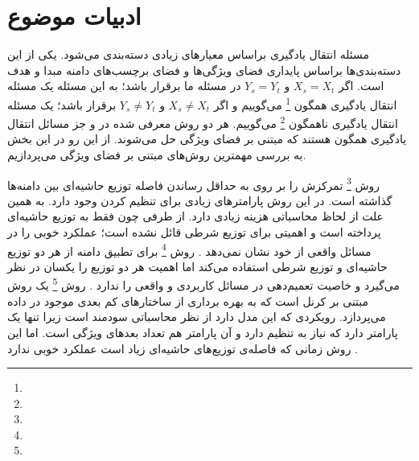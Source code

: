 \section{ادبیات موضوع}
{
	مسئله انتقال یادگیری براساس معیارهای زیادی دسته‌بندی می‌شود. یکی از این دسته‌بندی‌ها براساس پایداری فضای ویژگی‌ها و فضای برچسب‌های دامنه مبدا و هدف است. اگر 
	 $X_s = X_t$ 
	 و 
	 $Y_s=Y_t$
	 در مسئله ما برقرار باشد؛ به این مسئله یک مسئله انتقال یادگیری همگون
	 \footnote{}
	  می‌گوییم و اگر 
	  $X_s \neq X_t$ 
	 و 
	 $Y_s \neq Y_t$
	 برقرار باشد؛ یک مسئله انتقال یادگیری ناهمگون
	 \footnote{}
	  می‌گوییم. 
	 هر دو روش معرفی شده در 
	 \cite{wang2017balanced}
	 و
	 \cite{wang2019easy}
	 جز مسائل انتقال یادگیری همگون هستند که مبتنی بر فضای ویژگی حل می‌شوند. از این رو در این بخش به بررسی مهمترین روش‌های مبتنی بر فضای ویژگی می‌پردازیم.
	 
	 روش 
	 \footnote{}
	 تمرکزش را بر روی به حداقل رساندن فاصله توزیع حاشیه‌ای بین دامنه‌ها گذاشته است. در این روش پارامترهای زیادی برای تنظیم کردن وجود دارد. به همین علت از لحاظ محاسباتی هزینه زیادی دارد. از طرفی چون فقط به توزیع حاشیه‌ای پرداخته است و اهمیتی برای توزیع شرطی قائل نشده است؛ عملکرد خوبی را در مسائل واقعی از خود نشان نمی‌دهد
	 \cite{5640675}.
	 روش
	 \footnote{}
	 برای تطبیق دامنه از هر دو توزیع حاشیه‌ای و توزیع شرطی استفاده می‌کند اما اهمیت هر دو توزیع را یکسان در نظر می‌گیرد و خاصیت تعمیم‌دهی در مسائل کاربردی و واقعی را ندارد
	 \cite{6751384}.
	 روش
	 \footnote{}
     یک روش مبتنی بر کرنل است که به بهره برداری از ساختارهای کم بعدی موجود در داده می‌پردازد. رویکردی که این مدل دارد از نظر محاسباتی سودمند است زیرا تنها یک پارامتر دارد که نیاز به تنظیم دارد و آن پارامتر هم تعداد بعدهای ویژگی است. اما این روش زمانی که فاصله‌ی توزیع‌های حاشیه‌ای زیاد است عملکرد خوبی ندارد
     \cite{6247911}.
}

